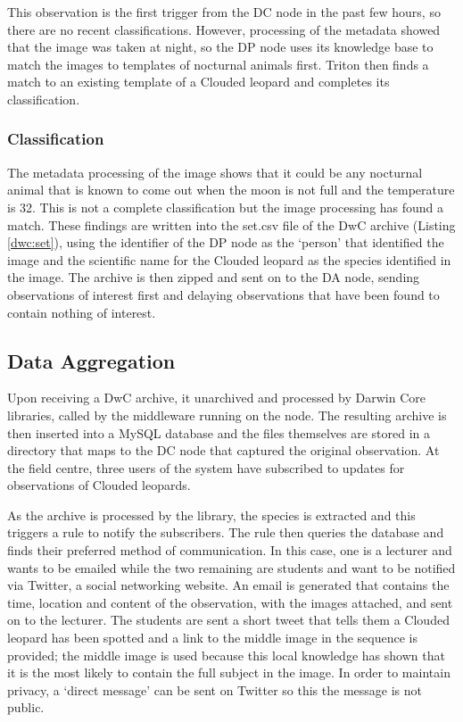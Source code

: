			This observation is the first trigger from the DC node in the past few hours, so there are no recent classifications. However, processing of the metadata showed that the image was taken at night, so the DP node uses its knowledge base to match the images to templates of nocturnal animals first. Triton then finds a match to an existing template of a Clouded leopard and completes its classification.
	
		\subsubsection{Classification}
		The metadata processing of the image shows that it could be any nocturnal animal that is known to come out when the moon is not full and the temperature is 32\celsius. This is not a complete classification but the image processing has found a match. These findings are written into the set.csv file of the DwC archive (Listing \ref{dwc:set}), using the identifier of the DP node as the `person' that identified the image and the scientific name for the Clouded leopard as the species identified in the image. The archive is then zipped and sent on to the DA node, sending observations of interest first and delaying observations that have been found to contain nothing of interest.
			
	\subsection{Data Aggregation}		
			Upon receiving a DwC archive, it unarchived and processed by Darwin Core libraries, called by the middleware running on the node. The resulting archive is then inserted into a MySQL database and the files themselves are stored in a directory that maps to the DC node that captured the original observation. At the field centre, three users of the system have subscribed to updates for observations of Clouded leopards.
			
			As the archive is processed by the library, the species is extracted and this triggers a rule to notify the subscribers. The rule then queries the database and finds their preferred method of communication. In this case, one is a lecturer and wants to be emailed while the two remaining are students and want to be notified via Twitter, a social networking website. An email is generated that contains the time, location and content of the observation, with the images attached, and sent on to the lecturer. The students are sent a short tweet that tells them a Clouded leopard has been spotted and a link to the middle image in the sequence is provided; the middle image is used because this local knowledge has shown that it is the most likely to contain the full subject in the image. In order to maintain privacy, a `direct message' can be sent on Twitter so this the message is not public.
			
